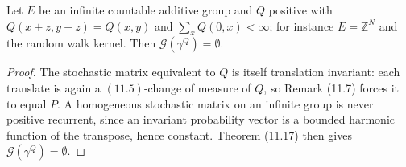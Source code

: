 \begin{corollary}[Georgii (11.19)]
    \label{cor:bl-11-19}
    \leanok

    Let $E$ be an infinite countable additive group and $Q$ positive with
    $Q(x+z,y+z) = Q(x,y)$ and $\sum_x Q(0,x) < \infty$; for instance $E = \mathbb Z^N$ and the
    random walk kernel. Then $\mathcal G(\gamma^Q) = \emptyset$.
\end{corollary}
\begin{proof}
    \leanok
    The stochastic matrix equivalent to $Q$ is itself translation invariant: each translate is
    again a $(11.5)$-change of measure of $Q$, so Remark (11.7) forces it to equal $P$. A
    homogeneous stochastic matrix on an infinite group is never positive recurrent, since an
    invariant probability vector is a bounded harmonic function of the transpose, hence constant.
    Theorem (11.17) then gives $\mathcal G(\gamma^Q) = \emptyset$.
\end{proof}
